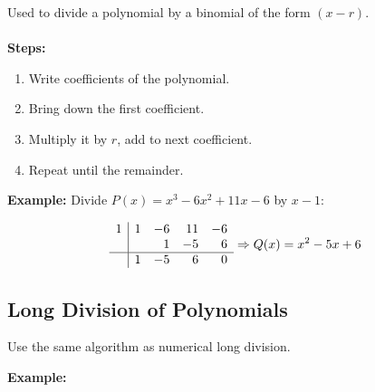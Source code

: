 Used to divide a polynomial by a binomial of the form \((x - r)\).
\\\\
\textbf{Steps:}
\begin{enumerate}
    \item Write coefficients of the polynomial.
    \item Bring down the first coefficient.
    \item Multiply it by \(r\), add to next coefficient.
    \item Repeat until the remainder.
\end{enumerate}

\textbf{Example:}
Divide \(P(x) = x^3 - 6x^2 + 11x - 6\) by \(x - 1\):

\[
\begin{array}{r|rrrr}
1 & 1 & -6 & 11 & -6 \\
  &   & 1 & -5 & 6 \\
\hline
  & 1 & -5 & 6 & 0 \\
\end{array}
\Rightarrow Q(x) = x^2 - 5x + 6
\]

\subsection{Long Division of Polynomials}

Use the same algorithm as numerical long division.

\textbf{Example:}

\bigskip
{}
